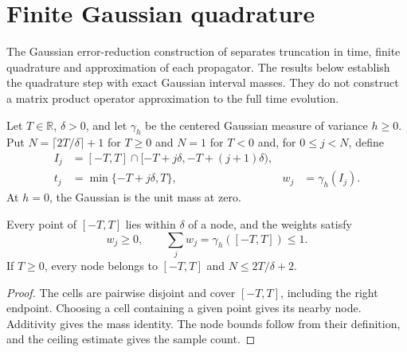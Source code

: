 \section{Finite Gaussian quadrature}
\label{sec:huang_gaussian_quadrature}

The Gaussian error-reduction construction of
\cite[Section 5.4, Lemma 19]{Huang2015GroundState} separates truncation in time,
finite quadrature and approximation of each propagator. The results below establish
the quadrature step with exact Gaussian interval masses. They do not construct a
matrix product operator approximation to the full time evolution.

\begin{definition}
    \label{def:huang_time_mesh}
    \leanok
    Let $T\in\mathbb R$, $\delta>0$, and let $\gamma_h$ be the centered Gaussian measure
    of variance $h\ge0$. Put $N=\lceil2T/\delta\rceil+1$ for $T\ge0$ and $N=1$ for
    $T<0$ and, for $0\le j<N$, define
    \begin{align*}
        I_j & =[-T,T]\cap[-T+j\delta,-T+(j+1)\delta),                         \\
        t_j & =\min\{-T+j\delta,T\},                  & w_j & =\gamma_h(I_j).
    \end{align*}
    At $h=0$, the Gaussian is the unit mass at zero.
\end{definition}

\begin{lemma}
    \label{thm:huang_time_mesh_mass}
    \leanok
    Every point of $[-T,T]$ lies within $\delta$ of a node, and the weights
    satisfy
    \[
        w_j\ge0,\qquad \sum_jw_j=\gamma_h([-T,T])\le1.
    \]
    If $T\ge0$, every node belongs to $[-T,T]$ and $N\le2T/\delta+2$.
\end{lemma}
\begin{proof}
    \leanok
    The cells are pairwise disjoint and cover $[-T,T]$, including the right endpoint.
    Choosing a cell containing a given point gives its nearby node.
    Additivity gives the mass identity. The node bounds follow from their definition,
    and the ceiling estimate gives the sample count.
\end{proof}

